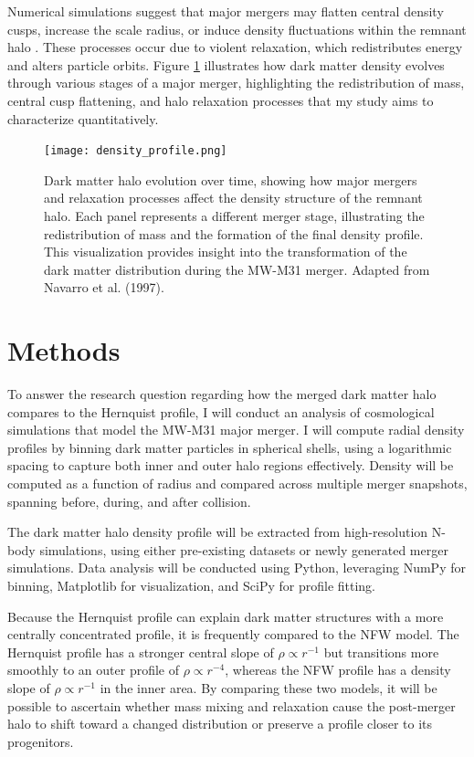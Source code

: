 \documentclass{mnras}
\begin{document}
Numerical simulations suggest that major mergers may flatten central density cusps, increase the scale radius, or induce density fluctuations within the remnant halo \citep[Prada 2019]{Prada2019}. These processes occur due to violent relaxation, which redistributes energy and alters particle orbits. Figure \ref{fig:density_evolution} illustrates how dark matter density evolves through various stages of a major merger, highlighting the redistribution of mass, central cusp flattening, and halo relaxation processes that my study aims to characterize quantitatively.

\begin{figure}
    \centering
    \texttt{[image: density\_profile.png]}
    \caption{Dark matter halo evolution over time, showing how major mergers and relaxation processes affect the density structure of the remnant halo. Each panel represents a different merger stage, illustrating the redistribution of mass and the formation of the final density profile. This visualization provides insight into the transformation of the dark matter distribution during the MW-M31 merger. Adapted from Navarro et al. (1997).}
    \label{fig:density_evolution}
\end{figure}

\section{Methods}

To answer the research question regarding how the merged dark matter halo compares to the Hernquist profile, I will conduct an analysis of cosmological simulations that model the MW-M31 major merger. I will compute radial density profiles by binning dark matter particles in spherical shells, using a logarithmic spacing to capture both inner and outer halo regions effectively. Density will be computed as a function of radius and compared across multiple merger snapshots, spanning before, during, and after collision.

The dark matter halo density profile will be extracted from high-resolution N-body simulations, using either pre-existing datasets or newly generated merger simulations. Data analysis will be conducted using Python, leveraging NumPy for binning, Matplotlib for visualization, and SciPy for profile fitting. 

Because the Hernquist profile can explain dark matter structures with a more centrally concentrated profile, it is frequently compared to the NFW model. The Hernquist profile has a stronger central slope of $\rho \propto r^{-1}$ but transitions more smoothly to an outer profile of $\rho \propto r^{-4}$, whereas the NFW profile has a density slope of $\rho \propto r^{-1}$ in the inner area. By comparing these two models, it will be possible to ascertain whether mass mixing and relaxation cause the post-merger halo to shift toward a changed distribution or preserve a profile closer to its progenitors.
\end{document}
